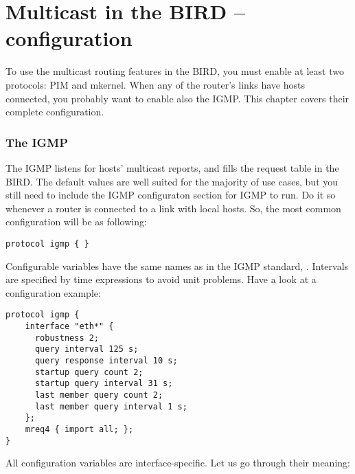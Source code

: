 \chapter{Multicast in the BIRD -- configuration}

To use the multicast routing features in the BIRD, you must enable at least two
protocols: PIM and mkernel. When any of the router's links have hosts
connected, you probably want to enable also the IGMP. This chapter covers their complete configuration.

\subsection{The IGMP}

The IGMP listens for hosts' multicast reports, and fills the request table in
the BIRD. The default values are well suited for the majority of use cases, but
you still need to include the IGMP configuraton section for IGMP to run. Do it
so whenever a router is connected to a link with local hosts. So, the most
common configuration will be as following:

\begin{lstlisting}
protocol igmp { }
\end{lstlisting}

Configurable variables have the same names as in the IGMP standard, .
Intervals are specified by time expressions to avoid unit problems. Have a look
at a configuration example:

\begin{lstlisting}
protocol igmp {
	interface "eth*" {
	  robustness 2;
	  query interval 125 s;
	  query response interval 10 s;
	  startup query count 2;
	  startup query interval 31 s;
	  last member query count 2;
	  last member query interval 1 s;
	};
	mreq4 { import all; };
}
\end{lstlisting}

All configuration variables are interface-specific. Let us go through their meaning:

